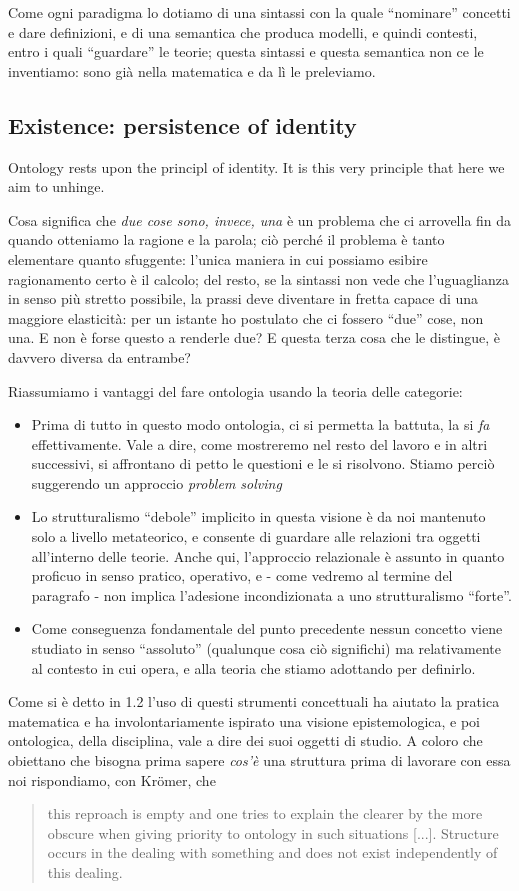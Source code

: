 Come ogni paradigma lo dotiamo di una sintassi con la quale ``nominare'' concetti e dare definizioni, e di una semantica che produca modelli, e quindi contesti, entro i quali ``guardare'' le teorie; questa sintassi e questa semantica non ce le inventiamo: sono già nella matematica e da lì le preleviamo.
\subsection{Existence: persistence of identity}
Ontology rests upon the principl of identity. It is this very principle that here we aim to unhinge.

Cosa significa che \emph{due cose sono, invece, una} è un problema che ci arrovella fin da quando otteniamo la ragione e la parola; ciò perché il problema è tanto elementare quanto sfuggente: l'unica maniera in cui possiamo esibire ragionamento certo è il calcolo; del resto, se la sintassi non vede che l'uguaglianza in senso più stretto possibile, la prassi deve diventare in fretta capace di una maggiore elasticità: per un istante ho postulato che ci fossero ``due'' cose, non una. E non è forse questo a renderle due? E questa terza cosa che le distingue, è davvero diversa da entrambe?

Riassumiamo i vantaggi del fare ontologia usando la teoria delle categorie:
	\begin{itemize}
		\item Prima di tutto in questo modo ontologia, ci si permetta la battuta, la si \emph{fa} effettivamente. Vale a dire, come mostreremo nel resto del lavoro e in altri successivi, si affrontano di petto le questioni e le si risolvono. Stiamo perciò suggerendo un approccio \emph{problem solving}
		\item Lo strutturalismo ``debole'' implicito in questa visione è da noi mantenuto solo a livello metateorico, e consente di guardare alle relazioni tra oggetti all'interno delle teorie. Anche qui, l'approccio relazionale è assunto in quanto proficuo in senso pratico, operativo, e - come vedremo al termine del paragrafo - non implica l'adesione incondizionata a uno strutturalismo ``forte''.
		\item Come conseguenza fondamentale del punto precedente nessun concetto viene studiato in senso ``assoluto'' (qualunque cosa ciò significhi) ma relativamente al contesto in cui opera, e alla teoria che stiamo adottando per definirlo.
	\end{itemize}

	Come si è detto in 1.2 l'uso di questi strumenti concettuali ha aiutato la pratica matematica e ha involontariamente ispirato una visione epistemologica, e poi ontologica, della disciplina, vale a dire dei suoi oggetti di studio. A coloro che obiettano che bisogna prima sapere \textit{cos'è} una struttura prima di lavorare con essa noi rispondiamo, con Kr\"omer, che
\begin{quote}
	this reproach is empty and one tries to explain the clearer by the more obscure when giving priority to ontology in such situations [...]. Structure occurs in the dealing with something and does
	not exist independently of this dealing. \cite{kromer2007tool}
\end{quote}



